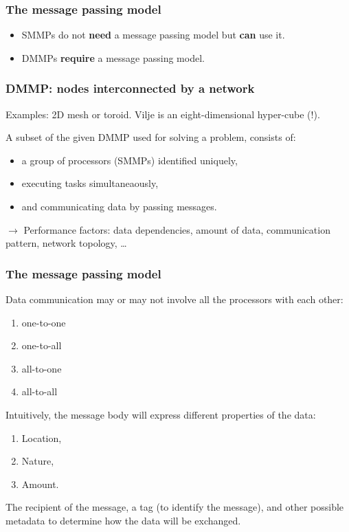 \begin{frame}
  \frametitle{The message passing model}
  \begin{center}
    
  \end{center}

\begin{itemize}
\item SMMPs do not \textbf{need} a message passing model but \textbf{can} use it.
\item DMMPs \textbf{require} a message passing model.
\end{itemize}
\end{frame}

\begin{frame}
  \frametitle{DMMP: nodes interconnected by a network}
  Examples: 2D mesh or toroid. Vilje is an eight-dimensional hyper-cube (!).
  \begin{center}
    
    \qquad
    
  \end{center}

A subset of the given DMMP used for solving a problem, consists of:
\begin{itemize}
\item a group of processors (SMMPs) identified uniquely,
\item executing tasks simultaneaously,
\item and communicating data by passing messages.
\end{itemize}

\medskip
$\rightarrow$ Performance factors: data dependencies, amount of data, communication pattern, network topology, \dots

\end{frame}


\begin{frame}
  \frametitle{The message passing model}

Data communication may or may not involve all the processors with each other:
\begin{enumerate}
\item one-to-one
\item one-to-all
\item all-to-one
\item all-to-all
\end{enumerate}

\bigskip
Intuitively, the message body will express different properties of the data:
\begin{enumerate}
\item Location,
\item Nature,
\item Amount.
\end{enumerate}

\medskip
The recipient of the message, a tag (to identify the message), and other possible metadata to determine how the data will be exchanged.

\end{frame}


